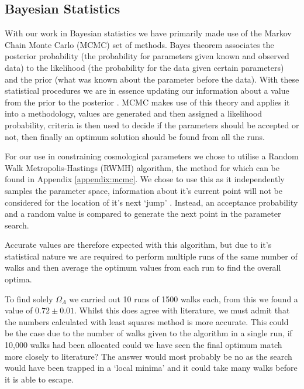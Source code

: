 \documentclass[twocolumn]{revtex4}
\begin{document}
{\vspace{-3ex}
\subsection{Bayesian Statistics} 
\vspace{-2ex}
With our work in Bayesian statistics we have primarily made use of the Markov Chain Monte Carlo (MCMC) set of methods. Bayes theorem associates the posterior probability (the probability for parameters given known and observed data) to the likelihood (the probability for the data given certain parameters) and the prior (what was known about the parameter before the data). With these statistical procedures we are in essence updating our information about a value from the prior to the posterior \cite{mcmc_bs}. MCMC makes use of this theory and applies it into a methodology, values are generated and then assigned a likelihood probability, criteria is then used to decide if the parameters should be accepted or not, then finally an optimum solution should be found from all the runs.

For our use in constraining cosmological parameters we chose to utilise a Random Walk Metropolis-Hastings (RWMH) algorithm, the method for which can be found in Appendix \ref{appendix:mcmc}. We chose to use this as it independently samples the parameter space, information about it's current point will not be considered for the location of it's next `jump' \cite{mcmc_bs}. Instead, an acceptance probability and a random value is compared to generate the next point in the parameter search.

Accurate values are therefore expected with this algorithm, but due to it's statistical nature we are required to perform multiple runs of the same number of walks and then average the optimum values from each run to find the overall optima.

To find solely $\Omega_\Lambda$ we carried out 10 runs of 1500 walks each, from this we found a value of $0.72\pm0.01$. Whilst this does agree with literature, we must admit that the numbers calculated with least squares method is more accurate. This could be the case due to the number of walks given to the algorithm in a single run, if 10,000 walks had been allocated could we have seen the final optimum match more closely to literature? The answer would most probably be no as the search would have been trapped in a `local minima' and it could take many walks before it is able to escape. 

}
\end{document}

